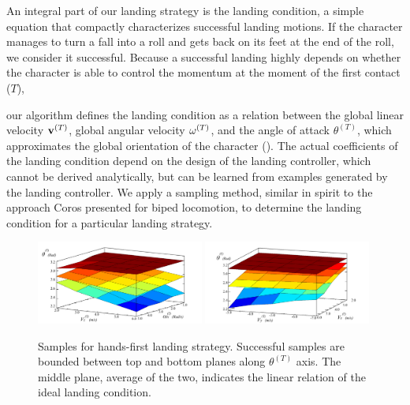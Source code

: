 An integral part of our landing strategy is the landing condition, a
simple equation that compactly characterizes successful landing
motions.
 If the character manages to turn a fall
into a roll and gets back on its feet at the end of the roll, we
consider it successful.  Because a successful landing highly depends
on whether the character is able to control the momentum
at the moment of the first contact ($T$),

our algorithm defines the landing condition as a relation between the
global linear velocity $\mathbf{v}^{(T)}$, global angular velocity
$\mathbf{\omega}^{(T)}$, and the angle of attack $\theta^{(T)}$, which
approximates the global orientation of the character
().
The actual
coefficients of the landing condition depend on the design of the
landing controller, which cannot be derived analytically, but can be
learned from examples generated by the landing controller. We apply a
sampling method, similar in spirit to the approach Coros \etal
\cite{Coros:2009:RTC} presented for biped locomotion, to determine the
landing condition for a particular landing strategy.  

\begin{figure}[ht]
\center
  \includegraphics[width=0.49\textwidth]{images/sampleVZWX}
  \includegraphics[width=0.49\textwidth]{images/sampleVYVZ}
  \caption{
    Samples for hands-first landing strategy. Successful samples are
    bounded between top and bottom planes along $\theta^{(T)}$
    axis. The middle plane, average of the two, indicates the linear
    relation of the ideal landing condition. 
  }
 \label{fig:landing_samplesPlanar}
\end{figure}
 
